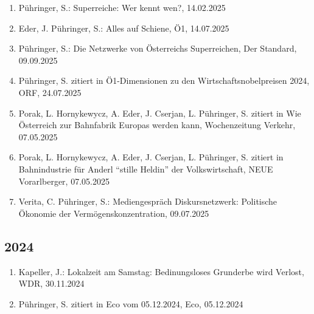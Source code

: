 \begin{enumerate}
	 \item Pühringer, S.: Superreiche: Wer kennt wen?, 14.02.2025
	 \item Eder, J. Pühringer, S.: Alles auf Schiene, Ö1, 14.07.2025
	 \item Pühringer, S.: Die Netzwerke von Österreichs Superreichen, Der Standard, 09.09.2025
	 \item Pühringer, S. zitiert in Ö1-Dimensionen zu den Wirtschaftsnobelpreisen 2024, ORF, 24.07.2025
	 \item Porak, L. Hornykewycz, A. Eder, J. Cserjan, L. Pühringer, S. zitiert in Wie Österreich zur Bahnfabrik Europas werden kann, Wochenzeitung Verkehr, 07.05.2025
	 \item Porak, L. Hornykewycz, A. Eder, J. Cserjan, L. Pühringer, S. zitiert in Bahnindustrie für Anderl “stille Heldin” der Volkswirtschaft, NEUE Vorarlberger, 07.05.2025
	 \item Verita, C. Pühringer, S.: Mediengespräch Diskursnetzwerk: Politische Ökonomie der Vermögenskonzentration, 09.07.2025
\end{enumerate}
\subsection*{2024}
\begin{enumerate}
	 \item Kapeller, J.: Lokalzeit am Samstag: Bedinungsloses Grunderbe wird Verlost, WDR, 30.11.2024
	 \item Pühringer, S. zitiert in Eco vom 05.12.2024, Eco, 05.12.2024
\end{enumerate}
